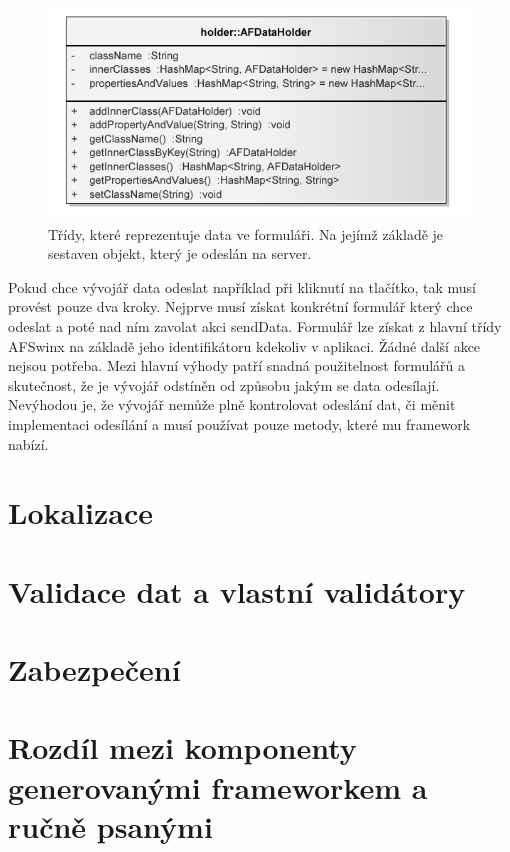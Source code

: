 \begin{figure}[h!]
\includegraphics{images/AFDataHolder}
\caption{Třídy, které reprezentuje data ve formuláři. Na jejímž základě je sestaven objekt, který je odeslán na server.}
\label{img:afDataHolder}
\end{figure}

Pokud chce vývojář data odeslat například při kliknutí na tlačítko, tak musí provést pouze dva kroky. Nejprve musí získat konkrétní formulář který chce odeslat a poté nad ním zavolat akci sendData. Formulář lze získat z hlavní třídy AFSwinx na základě jeho identifikátoru kdekoliv v aplikaci. Žádné další akce nejsou potřeba. Mezi hlavní výhody patří snadná použitelnost formulářů a skutečnost, že je vývojář odstíněn od způsobu jakým se data odesílají. Nevýhodou je, že vývojář nemůže plně kontrolovat odeslání dat, či měnit implementaci odesílání a musí používat pouze metody, které mu framework nabízí.
\section{Lokalizace}
\section{Validace dat a vlastní validátory}
\section{Zabezpečení}
\section{Rozdíl mezi komponenty generovanými frameworkem a ručně psanými}

